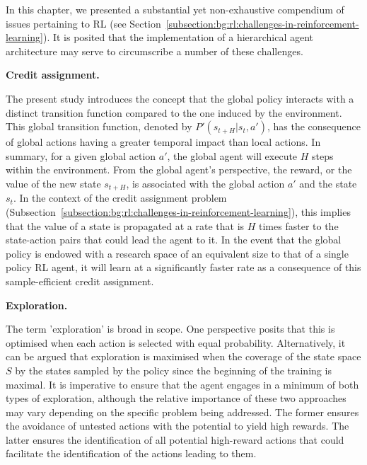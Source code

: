 In this chapter, we presented a substantial yet non-exhaustive compendium of issues pertaining to RL
(see Section~\ref{subsection:bg:rl:challenges-in-reinforcement-learning}).
It is posited that the implementation of a hierarchical agent architecture may serve to circumscribe a number of these
challenges.

\textbf{Credit assignment.}\label{paragraphe:bg:plan-rl:impact:credit-assignment}

The present study introduces the concept that the global policy interacts with a distinct transition function compared
to the one induced by the environment.
This global transition function, denoted by $P'(s_{t+H} | s_t, a')$, has the consequence of global actions having a
greater temporal impact than local actions.
In summary, for a given global action $a'$, the global agent will execute $H$ steps within the environment.
From the global agent's perspective, the reward, or the value of the new state $s_{t+H}$, is associated with the global
action $a'$ and the state $s_t$.
In the context of the credit assignment problem
(Subsection~\ref{subsection:bg:rl:challenges-in-reinforcement-learning}), this implies that the value of a state is
propagated at a rate that is $H$ times faster to the state-action pairs that could lead the agent to it.
In the event that the global policy is endowed with a research space of an equivalent size to that of a single policy
RL agent, it will learn at a significantly faster rate as a consequence of this sample-efficient credit assignment.

\textbf{Exploration.}


The term 'exploration' is broad in scope.
One perspective posits that this is optimised when each action is selected with equal probability.
Alternatively, it can be argued that exploration is maximised when the coverage of the state space $S$ by the states
sampled by the policy since the beginning of the training is maximal.
It is imperative to ensure that the agent engages in a minimum of both types of exploration, although the relative
importance of these two approaches may vary depending on the specific problem being addressed.
The former ensures the avoidance of untested actions with the potential to yield high rewards.
The latter ensures the identification of all potential high-reward actions that could facilitate the identification of
the actions leading to them.

